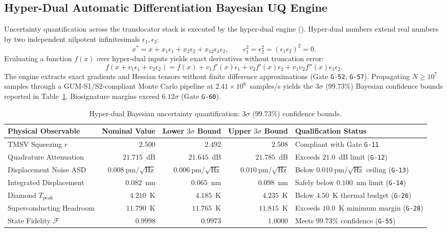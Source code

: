 \documentclass[11pt,onecolumn]{article}
\begin{document}
\FloatBarrier
\subsection{Hyper-Dual Automatic Differentiation Bayesian UQ Engine}
Uncertainty quantification across the translocator stack is executed by the hyper-dual engine (). Hyper-dual numbers extend real numbers by two independent nilpotent infinitesimals $\epsilon_1, \epsilon_2$:
\begin{equation}
x^* = x + x_1\epsilon_1 + x_2\epsilon_2 + x_{12}\epsilon_1\epsilon_2, \qquad \epsilon_1^2 = \epsilon_2^2 = (\epsilon_1\epsilon_2)^2 = 0.
\end{equation}
Evaluating a function $f(x)$ over hyper-dual inputs yields exact derivatives without truncation error:
\begin{equation}
f(x + v_1\epsilon_1 + v_2\epsilon_2) = f(x) + v_1 f'(x)\epsilon_1 + v_2 f'(x)\epsilon_2 + v_1 v_2 f''(x)\epsilon_1\epsilon_2.
\end{equation}
The engine extracts exact gradients and Hessian tensors without finite difference approximations (Gate \texttt{G-52}, \texttt{G-57}). Propagating $N \ge 10^7$ samples through a GUM-S1/S2-compliant Monte Carlo pipeline at $2.41\times 10^8$~samples/s yields the $3\sigma$ ($99.73\%$) Bayesian confidence bounds reported in Table~\ref{tab:uq_table}. Biosignature margins exceed $6.12\sigma$ (Gate \texttt{G-60}).

\begin{table}[!htbp]
\centering\small
\caption{Hyper-dual Bayesian uncertainty quantification: $3\sigma$ ($99.73\%$) confidence bounds.}
\label{tab:uq_table}
\begin{tabularx}{\textwidth}{@{}l r r r X@{}}
\toprule
Physical Observable & Nominal Value & Lower $3\sigma$ Bound & Upper $3\sigma$ Bound & Qualification Status \\
\midrule
TMSV Squeezing $r$ & $2.500$ & $2.492$ & $2.508$ & Compliant with Gate \texttt{G-11} \\
Quadrature Attenuation & $21.715$~dB & $21.645$~dB & $21.785$~dB & Exceeds $21.0$~dB limit (\texttt{G-12}) \\
Displacement Noise ASD & $0.008~\text{pm}/\sqrt{\text{Hz}}$ & $0.006~\text{pm}/\sqrt{\text{Hz}}$ & $0.010~\text{pm}/\sqrt{\text{Hz}}$ & Below $0.010~\text{pm}/\sqrt{\text{Hz}}$ ceiling (\texttt{G-13}) \\
Integrated Displacement & $0.082$~nm & $0.065$~nm & $0.098$~nm & Safely below $0.100$~nm limit (\texttt{G-14}) \\
Diamond $T_{\text{peak}}$ & $4.210$~K & $4.185$~K & $4.235$~K & Below $4.50$~K thermal budget (\texttt{G-26}) \\
Superconducting Headroom & $11.790$~K & $11.765$~K & $11.815$~K & Exceeds $10.0$~K minimum margin (\texttt{G-28}) \\
State Fidelity $\mathcal{F}$ & $0.9998$ & $0.9973$ & $1.0000$ & Meets $99.73\%$ confidence (\texttt{G-55}) \\
\bottomrule
\end{tabularx}
\end{table}
\end{document}
